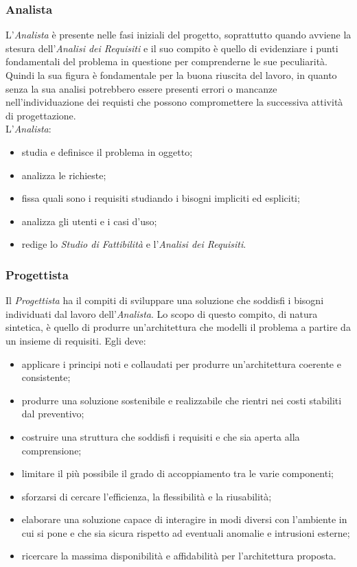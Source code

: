 \subsubsection{Analista}\label{4.2.2.3}

L'\textit{Analista} è presente nelle fasi iniziali del progetto, soprattutto quando avviene la stesura dell'\textit{Analisi dei Requisiti} e il suo compito è quello di evidenziare i punti fondamentali del problema in questione per comprenderne le sue peculiarità. Quindi la sua figura è fondamentale per la buona riuscita del lavoro, in quanto senza la sua analisi potrebbero essere presenti errori o mancanze nell'individuazione dei requisti che possono compromettere la successiva attività di progettazione.\\
L'\textit{Analista}:
\begin{itemize}
	\item studia e definisce il problema in oggetto;
	\item analizza le richieste;
	\item fissa quali sono i requisiti studiando i bisogni impliciti ed espliciti;
	\item analizza gli utenti e i casi d'uso;
	\item redige lo \textit{Studio di Fattibilità} e l'\textit{Analisi dei Requisiti}. 
\end{itemize}

\subsubsection{Progettista}\label{4.2.2.4}

Il \textit{Progettista} ha il compiti di sviluppare una soluzione che soddisfi i bisogni individuati dal lavoro dell'\textit{Analista}. Lo scopo di questo compito, di natura sintetica, è quello di produrre un'architettura che modelli il problema a partire da un insieme di requisiti. Egli deve:
\begin{itemize}
	\item applicare i principi noti e collaudati per produrre un'architettura coerente e consistente;
	\item produrre una soluzione sostenibile e realizzabile che rientri nei costi stabiliti dal preventivo;
	\item costruire una struttura che soddisfi i requisiti e che sia aperta alla comprensione;
	\item limitare il più possibile il grado di accoppiamento tra le varie componenti;
	\item sforzarsi di cercare l'efficienza, la flessibilità e la riusabilità;
	\item elaborare una soluzione capace di interagire in modi diversi con l'ambiente in cui si pone e che sia sicura rispetto ad eventuali anomalie e intrusioni esterne;
	\item ricercare la massima disponibilità e affidabilità per l'architettura proposta.
\end{itemize}

